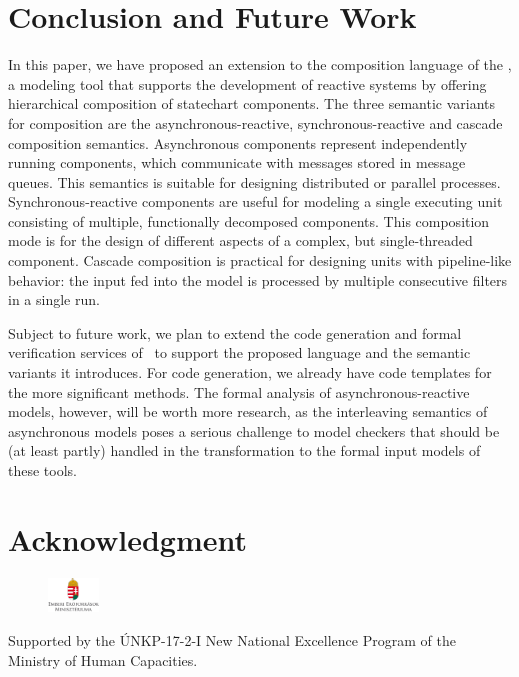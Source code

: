 \section{Conclusion and Future Work}
\label{sec:conclusion}
In this paper, we have proposed an extension to the composition language of the \framework, a modeling tool that supports the development of reactive systems by offering hierarchical composition of statechart components. The three semantic variants for composition are the asynchronous-reactive, synchronous-reactive and cascade composition semantics. Asynchronous components represent independently running components, which communicate with messages stored in message queues. This semantics is suitable for designing
distributed or parallel processes. Synchronous-reactive components are useful for modeling a single executing unit consisting of multiple, functionally decomposed components.
This composition mode is for the design of different aspects of a complex, but single-threaded component. Cascade composition is practical for designing units with pipeline-like behavior: the input fed into the model is processed by multiple consecutive filters in a single run.

Subject to future work, we plan to extend the code generation and formal verification services of \gamma\ to support the proposed language and the semantic variants it introduces. For code generation, we already have code templates for the more significant methods. The formal analysis of asynchronous-reactive models, however, will be worth more research, as the interleaving semantics of asynchronous models poses a serious challenge to model checkers that should be (at least partly) handled in the transformation to the formal input models of these tools.

\section*{Acknowledgment}
\begin{figure}[!h]
	\centering
	\includegraphics[width=0.12\textwidth]{figures/unkp_logo.jpg}
\end{figure}
Supported by the \'UNKP-17-2-I New National Excellence Program of the Ministry of Human Capacities.
